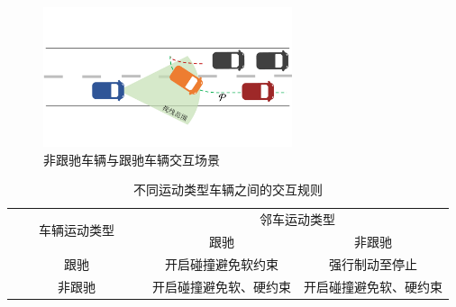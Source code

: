 \begin{figure}[t]
\centering
\includegraphics[width=0.65\textwidth]{figure/reversing/on road v2_cn.pdf}
\caption[非跟驰车辆与跟驰车辆交互场景]{
非跟驰车辆与跟驰车辆交互场景
}
\label{fig:reversing_onroad}
\end{figure}


\begin{table}[b]
\setlength{\belowcaptionskip}{0.4cm}
\centering
\caption[不同运动类型车辆之间的交互规则]{
不同运动类型车辆之间的交互规则
}
\label{tab:reversing_rules}
\renewcommand\arraystretch{1.7}
\begin{tabular}{@{}clcc@{}}
\toprule
\multicolumn{2}{c}{\multirow{2}{*}{$\qquad$车辆运动类型$\qquad$}} & \multicolumn{2}{c}{$\qquad$邻车运动类型$\qquad$} \\ \cmidrule(l){3-4} 
\multicolumn{2}{c}{}                                     & 跟驰     & 非跟驰    \\ \midrule
\multicolumn{2}{c}{跟驰}                        & 开启碰撞避免软约束               & 强行制动至停止                  \\
\multicolumn{2}{c}{非跟驰}                    & 开启碰撞避免软、硬约束               & 开启碰撞避免软、硬约束                  \\ \bottomrule
\end{tabular}
\end{table}


